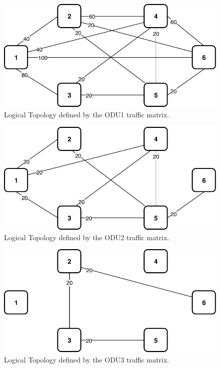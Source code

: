 \begin{figure}[h!]
\centering
\includegraphics[width=12cm]{sdf/ilp/opaque_survivability/figures/logical_topology_ODU1_high}
\caption{Logical Topology defined by the ODU1 traffic matrix.}
\label{logical_ODU1_high}
\end{figure}

\begin{figure}[h!]
\centering
\includegraphics[width=12cm]{sdf/ilp/opaque_survivability/figures/logical_topology_ODU2_high}
\caption{Logical Topology defined by the ODU2 traffic matrix.}
\label{logical_ODU2_high}
\end{figure}

\begin{figure}[h!]
\centering
\includegraphics[width=12cm]{sdf/ilp/opaque_survivability/figures/logical_topology_ODU3_high}
\caption{Logical Topology defined by the ODU3 traffic matrix.}
\label{logical_ODU3_high}
\end{figure}

